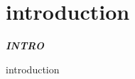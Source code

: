 
\SkipTocEntry\chapter*{introduction}
\addtocounter{section}{2}
\begin{fullwidth}

{\itshape\bfseries INTRO

}

introduction

\clearpage
\end{fullwidth}
